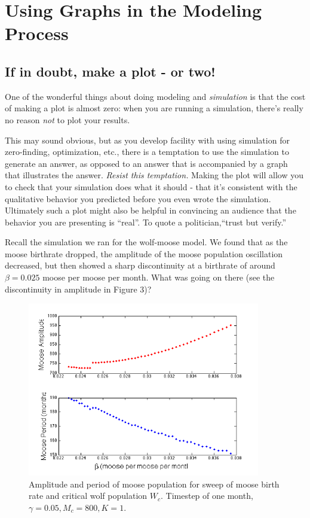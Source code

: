 \documentclass{tufte-handout}
\begin{document}
\section{Using Graphs in the Modeling Process}

\subsection{If in doubt, make a plot - or two!}

One of the wonderful things about doing modeling and {\it simulation} is that the cost of making a plot is almost zero:  when you are running a simulation, there's really no reason {\it not} to plot your results. 

This may sound obvious, but as you develop facility with using simulation for zero-finding, optimization, etc., there is a temptation to use the simulation to generate an answer, as opposed to an answer that is accompanied by a graph that illustrates the answer.  {\it Resist this temptation.}  Making the plot will allow you to check that your simulation does what it should - that it's consistent with the qualitative behavior you predicted before you even wrote the simulation.  Ultimately such a plot might also be helpful in convincing an audience that the behavior you are presenting is ``real''.  To quote a politician,``trust but verify.'' 

Recall the simulation we ran for the wolf-moose model.  We found that as the moose birthrate dropped, the amplitude of the moose population oscillation decreased, but then showed a sharp discontinuity at a birthrate of around  $\beta = 0.025$ moose per moose per month.  What was going on there (see the discontinuity in amplitude in Figure 3)?  

\begin{figure}[h!]
\includegraphics[width=4in]{figs/MooseBCSweep}
\caption{Amplitude and period of moose population for sweep of moose birth rate and critical wolf population $W_c$.  Timestep of one month,  $\gamma = 0.05, M_c = 800, K=1$.}
\end{figure}
\end{document}
